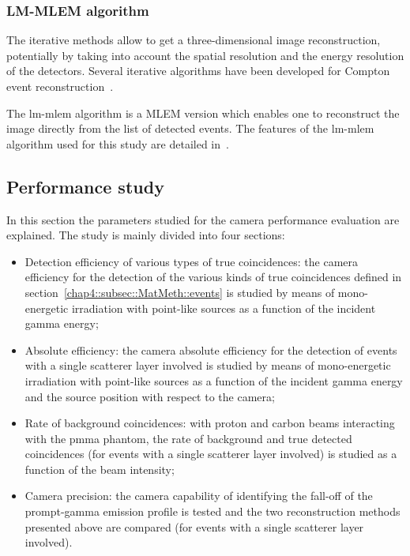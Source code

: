 \subsubsection{LM-MLEM algorithm}\label{chap4::subsubsec::lmmlemalgo}	
The iterative methods allow to get a three-dimensional image reconstruction, potentially by taking into account the spatial resolution and the energy resolution of the detectors. Several iterative algorithms have been developed for Compton event reconstruction~\parencite{Schone2010, Zoglauer2011, Gillam2011, Mackin2012, Huang2018, Taya2017, Schone2017}.

The \gls{lm-mlem} algorithm is a MLEM version which enables one to reconstruct the image directly from the list of detected events.
The features of the \gls{lm-mlem} algorithm used for this study are detailed in~\cite{Hilaire2014}.

\subsection{Performance study}\label{chap4::subsec::MatMeth:performance}
In this section the parameters studied for the camera performance evaluation are explained. The study is mainly divided into four sections:
\begin{itemize}
\item Detection efficiency of various types of true coincidences: the camera efficiency for the detection of the various kinds of true coincidences defined in section~\ref{chap4::subsec::MatMeth::events} is studied by means of mono-energetic irradiation with point-like sources as a function of the incident gamma energy;
\item Absolute efficiency: the camera absolute efficiency for the detection of events with a single scatterer layer involved is studied by means of mono-energetic irradiation with point-like sources as a function of the incident gamma energy and the source position with respect to the camera;
\item Rate of background coincidences: with proton and carbon beams interacting with the \gls{pmma} phantom, the rate of background and true detected coincidences (for events with a single scatterer layer involved) is studied as a function of the beam intensity;
\item Camera precision: the camera capability of identifying the fall-off of the prompt-gamma emission profile is tested and the two reconstruction methods presented above are compared (for events with a single scatterer layer involved). 
\end{itemize}

